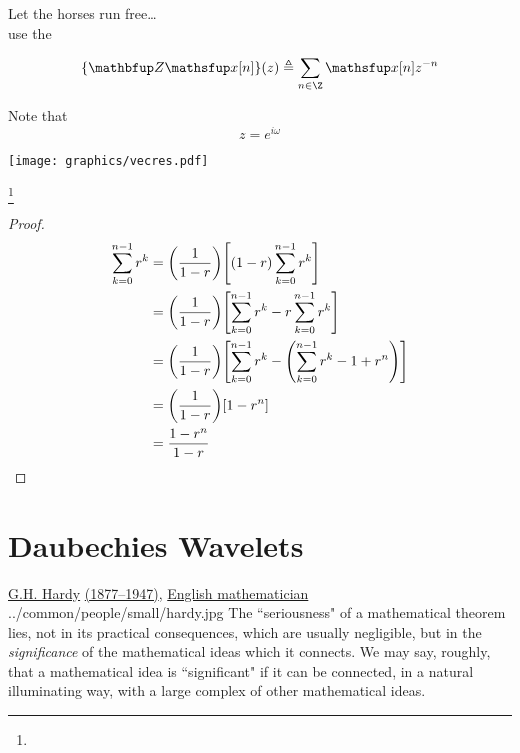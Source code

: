 \newpage

Let the horses run free\ldots\\ use the 

\[{\brb{\opZ    \fx[n]}(z) \eqd \sum_{n\in\Z} \fx[n] z^{-n}} \]

Note that \[ z=e^{i\omega} \]


\newpage


\texttt{[image: graphics/vecres.pdf]}

\newpage
\footnote{
  }
\label{thm:series_geometric}
\\
\begin{proof}
\begin{align*}
  \sum_{k=0}^{n-1} r^k
    &= {\left(\frac{1}{1-r}\right)}{\left[{\left(1-r\right)}\sum_{k=0}^{n-1} r^k\right]}
  \\&= {\left(\frac{1}{1-r}\right)}{\left[\sum_{k=0}^{n-1} r^k - r\sum_{k=0}^{n-1} r^k\right]}
  \\&= {\left(\frac{1}{1-r}\right)}{\left[\sum_{k=0}^{n-1} r^k - {\left(\sum_{k=0}^{n-1} r^k -1 + r^n\right)}\right]}
  \\&= {\left(\frac{1}{1-r}\right)}{\left[1 - r^n\right]}
  \\&= \frac{1-r^n}{1-r}
\end{align*}
\end{proof}


\newpage
\section{Daubechies Wavelets}
\qboxnps
  {\href{http://en.wikipedia.org/wiki/G._H._Hardy}{G.H. Hardy}
   \href{http://www-history.mcs.st-andrews.ac.uk/Timelines/TimelineG.html}{(1877--1947)},
   \href{http://www-history.mcs.st-andrews.ac.uk/BirthplaceMaps/Places/UK.html}{English mathematician}
    \footnotemark
  }
  {../common/people/small/hardy.jpg}
  {The ``seriousness" of a mathematical theorem lies,
    not in its practical consequences,
    which are usually negligible,
    but in the {\em significance} of the mathematical ideas which it connects.
    We may say, roughly, that a mathematical idea is ``significant" if it can be
    connected, in a natural illuminating way,
    with a large complex of other mathematical ideas.}
\newpage

